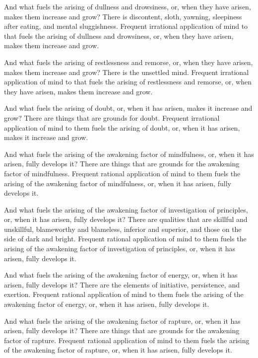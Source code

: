 \documentclass[12pt,openany]{book}%
\begin{document}
And what fuels the arising of dullness and drowsiness, or, when they have arisen, makes them increase and grow? There is discontent, sloth, yawning, sleepiness after eating, and mental sluggishness. Frequent irrational application of mind to that fuels the arising of dullness and drowsiness, or, when they have arisen, makes them increase and grow. 

And what fuels the arising of restlessness and remorse, or, when they have arisen, makes them increase and grow? There is the unsettled mind. Frequent irrational application of mind to that fuels the arising of restlessness and remorse, or, when they have arisen, makes them increase and grow. 

And what fuels the arising of doubt, or, when it has arisen, makes it increase and grow? There are things that are grounds for doubt. Frequent irrational application of mind to them fuels the arising of doubt, or, when it has arisen, makes it increase and grow. 

And what fuels the arising of the awakening factor of mindfulness, or, when it has arisen, fully develops it? There are things that are grounds for the awakening factor of mindfulness. Frequent rational application of mind to them fuels the arising of the awakening factor of mindfulness, or, when it has arisen, fully develops it. 

And what fuels the arising of the awakening factor of investigation of principles, or, when it has arisen, fully develops it? There are qualities that are skillful and unskillful, blameworthy and blameless, inferior and superior, and those on the side of dark and bright. Frequent rational application of mind to them fuels the arising of the awakening factor of investigation of principles, or, when it has arisen, fully develops it. 

And what fuels the arising of the awakening factor of energy, or, when it has arisen, fully develops it? There are the elements of initiative, persistence, and exertion. Frequent rational application of mind to them fuels the arising of the awakening factor of energy, or, when it has arisen, fully develops it. 

And what fuels the arising of the awakening factor of rapture, or, when it has arisen, fully develops it? There are things that are grounds for the awakening factor of rapture. Frequent rational application of mind to them fuels the arising of the awakening factor of rapture, or, when it has arisen, fully develops it. 
\end{document}
